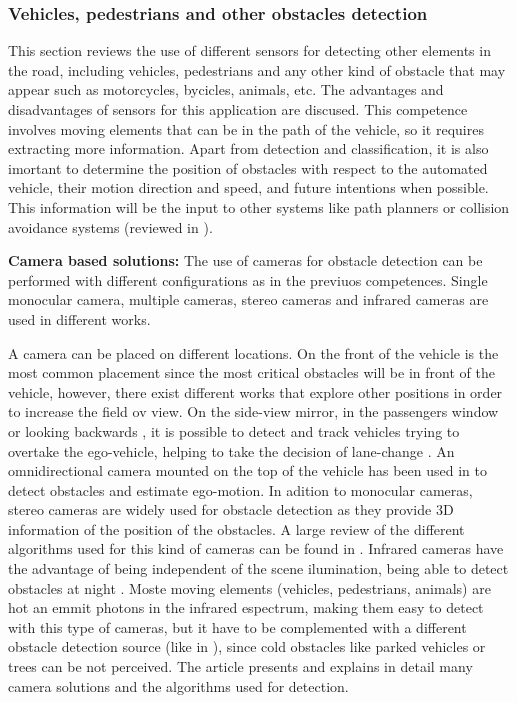 \subsubsection{Vehicles, pedestrians and other obstacles detection}
This section reviews the use of different sensors for detecting other elements 
in the road, including vehicles, pedestrians and any other kind of obstacle 
that may appear such as motorcycles, bycicles, animals, etc. 
The advantages and disadvantages of sensors for this application are discused.
This competence involves moving elements that can be in the path of the 
vehicle, so it requires extracting more information. Apart from detection and 
classification, it is also imortant to determine the position of obstacles with 
respect to the automated vehicle, their motion direction and speed, and future 
intentions when possible. 
This information will be the input to other systems like path planners 
or collision avoidance systems (reviewed in \cite{mukhtar2015vehicle}).


\textbf{Camera based solutions:}
The use of cameras for obstacle detection can be performed with different 
configurations as in the previuos competences. Single monocular 
camera, multiple cameras, stereo cameras and infrared cameras are used in 
different works.

A camera can be placed on different locations. On the front of the vehicle is 
the most common placement since the most critical obstacles will be in front of 
the vehicle, however, there exist different works that explore other positions 
in order to increase the field ov view. On the side-view mirror, in the 
passengers window \cite{chang2008real} or looking backwards \cite{liu2007rear}, 
it is possible to detect and track vehicles trying to overtake the ego-vehicle, 
helping to take the decision of lane-change \cite{alonso2008lane, 
song2007lateral, blanc2007larasidecam}. An omnidirectional camera mounted
on the top of the vehicle has been used in \cite{gandhi2006vehicle}
to detect obstacles and estimate ego-motion.
In adition to monocular cameras, stereo cameras are widely used for obstacle 
detection as they provide 3D information of the position of the obstacles. A 
large review of the different algorithms used for this kind of cameras can be 
found in \cite{bernini2014real}.
Infrared cameras have the advantage of being independent of the scene 
ilumination, being able to detect obstacles at night 
\cite{olmeda2013pedestrian}. Moste moving elements (vehicles, 
pedestrians, animals) are hot an emmit photons in the infrared espectrum, 
making them easy to detect with this type of cameras, but it have to be 
complemented with a different obstacle detection source (like in 
\cite{krotosky2007color}), since cold obstacles like parked vehicles or trees 
can be not perceived.
The article \cite{sivaraman2013looking} presents and explains in detail many
camera solutions and the algorithms used for detection.

